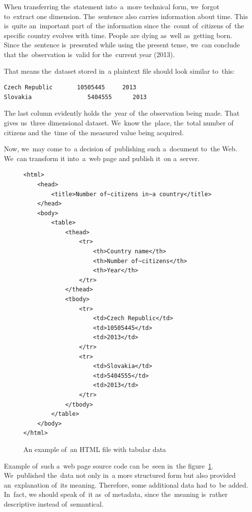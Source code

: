 When transferring the~statement into~a~more technical form, we~forgot to~extract one
dimension. The~sentence also carries information about time. This is~quite an~important
part of~the information since the~count of~citizens of~the specific country evolves with time.
People are dying as~well as~getting born. Since the~sentence is~presented while using the
present tense, we~can conclude that the~observation is~valid for the~current year (2013).

That means the~dataset stored in~a plaintext file should look similar to~this:

\begin{verbatim}
Czech Republic       10505445     2013
Slovakia	            5404555      2013
\end{verbatim}

The last column evidently holds the~year of~the observation being made.
That gives us~three dimensional dataset. We~know the~place, the~total number of
citizens and the~time of~the measured value being acquired.

Now, we~may come to~a decision of~publishing such a~document to~the Web. We~can transform
it into~a~web page and publish it~on a~server.
\begin{figure}
\small\begin{verbatim}
<html>
    <head>
        <title>Number of~citizens in~a country</title>
    </head>
    <body>
        <table>
            <thead>
                <tr>
                    <th>Country name</th>
                    <th>Number of~citizens</th>
                    <th>Year</th>
                </tr>
            </thead>
            <tbody>
                <tr>
                    <td>Czech Republic</td>
                    <td>10505445</td>
                    <td>2013</td>
                </tr>
                <tr>
                    <td>Slovakia</td>
                    <td>5404555</td>
                    <td>2013</td>
                </tr>
            </tbody>
        </table>
    </body>
</html>
\end{verbatim}\normalsize
\caption{An example of~an HTML file with tabular data}
\label{fig:rdf-html-01}
\end{figure}

Example of~such a~web page source code can be~seen in~the 
figure~\ref{fig:rdf-html-01}. We~published the~data not only in~a more structured form but also
provided an~explanation of~its meaning. Therefore, some additional data had to~be added. In~fact, we
should speak of~it as~of metadata, since the~meaning is~rather descriptive instead of~semantical.

